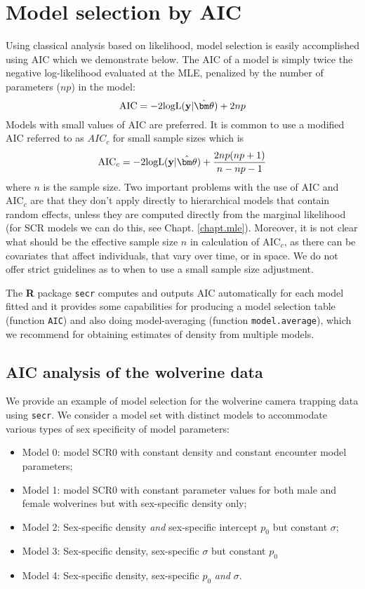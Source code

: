 \section{Model selection by AIC}
\label{gof.sec.aic}

Using classical analysis based on likelihood, model selection
is easily accomplished using AIC \citep{burnham_anderson:2002}
which we demonstrate below. The AIC of a model is simply twice the
negative log-likelihood evaluated at the MLE, penalized by the number of parameters
($np$) in the model:
\[
 \mbox{AIC} = -2 \mbox{logL}({\bf y}|\hat{\bm \theta})  + 2 np
\]
Models with small values of AIC are preferred.
It is common to use a modified AIC referred to as $AIC_{c}$ for small
sample sizes which is
\[
 \mbox{AIC}_{c}  =
-2 \mbox{logL}({\bf y}|\hat{\bm \theta})  + \frac{2 np
  (np+1)}{n-np-1}
\]
where $n$ is the sample size.  Two important problems with the use of
AIC and AIC$_{c}$ are that they don't apply directly to hierarchical
models that contain random effects, unless they are computed directly
from the marginal likelihood (for SCR models we can do this, see
Chapt. \ref{chapt.mle}). Moreover, it is not clear what should be the
effective sample size $n$ in calculation of AIC$_{c}$, as there can be
covariates that affect individuals, that vary over time, or in space.
We do not offer strict guidelines as to when to use a small sample
size adjustment.

The {\bf R} package \mbox{\tt secr} computes and outputs AIC
automatically for each model fitted and it provides some capabilities
for producing a model selection table (function \mbox{\tt AIC}) and
also doing model-averaging (function \mbox{\tt model.average}), which
we recommend for obtaining estimates of density from multiple models.

\subsection{AIC analysis of the wolverine data}

We provide an example of model selection for the wolverine camera
trapping data using \mbox{\tt secr}.
 We consider a model set with  distinct models to accommodate
various types of sex specificity of model parameters:
\hspace{.5in} \begin{itemize}
\item[] Model 0: model SCR0 with constant density and constant
  encounter model parameters;
\item[] Model 1: model SCR0 with constant parameter
values for both male and female wolverines but with sex-specific
density only;
\item[] Model 2: Sex-specific density {\it and} sex-specific intercept
$p_{0}$ but constant $\sigma$;
\item[] Model 3: Sex-specific density, sex-specific $\sigma$ but constant
$p_{0}$
\item[] Model 4: Sex-specific density, sex-specific $p_{0}$ {\it and} $\sigma$.
\end{itemize}

